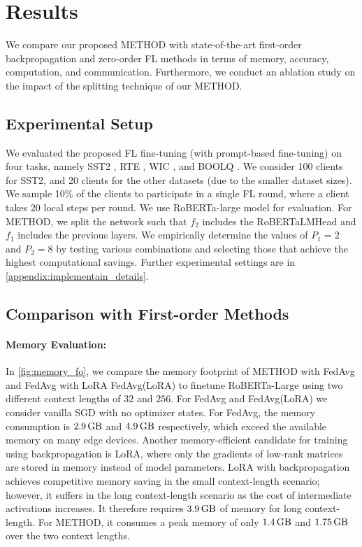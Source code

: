 \section{Results}
We compare our proposed \ac{METHOD} with state-of-the-art first-order backpropagation and zero-order \ac{FL} methods in terms of memory, accuracy, computation, and communication. Furthermore, we conduct an ablation study on the impact of the splitting technique of our \ac{METHOD}.  


\subsection{Experimental Setup}

We evaluated the proposed \ac{FL} fine-tuning (with prompt-based fine-tuning) on four tasks, namely SST2 \cite{sst2_cite}, RTE \cite{rte_cite}, WIC \cite{wic_cite}, and BOOLQ \cite{boolq_cite}. We consider 100 clients for SST2, and 20 clients for the other datasets (due to the smaller dataset sizes). We sample 10\% of the clients to participate in a single \ac{FL} round, where a client takes $20$ local steps per round. We use RoBERTa-large model \cite{roberta_cite}  for evaluation.  For \ac{METHOD}, we split the network such that $f_{2}$ includes the RoBERTaLMHead and $f_{1}$ includes the previous layers. We empirically determine the values of $P_{1}=2$ and $P_{2}=8$ by testing various combinations and selecting those that achieve the highest computational savings. Further experimental settings are in \cref{appendix:implementain_details}.



\subsection{Comparison with First-order Methods}

\paragraph{Memory Evaluation:} 

In \cref{fig:memory_fo}, we compare the memory footprint of \ac{METHOD} with FedAvg and FedAvg with LoRA FedAvg(LoRA) to finetune RoBERTa-Large using two different context lengths of $32$ and $256$. For FedAvg and FedAvg(LoRA) we consider vanilla SGD with no optimizer states. For FedAvg, the memory consumption is $ \SI{2.9}{\giga \byte}$ and $\SI{4.9}{\giga \byte}$ respectively, which exceed the available memory on many edge devices. Another memory-efficient candidate for training using backpropagation is LoRA, where only the gradients of low-rank matrices are stored in memory instead of model parameters. LoRA with backpropagation achieves competitive memory saving in the small context-length scenario; however, it suffers in the long context-length scenario as the cost of intermediate activations increases. It therefore requires $\SI{3.9}{\giga \byte}$ of memory for long context-length. For \ac{METHOD}, it consumes a peak memory of only $\SI{1.4}{\giga \byte}$ and $\SI{1.75}{\giga \byte}$ over the two context lengths. 



